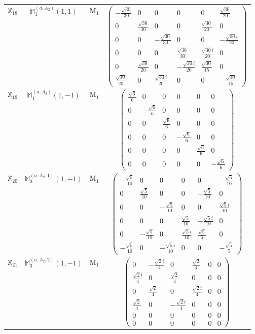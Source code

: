 \documentclass[fleqn,10pt,landscape]{article}
\begin{document}
\begin{itemize}
\begin{center}
\begin{longtable}{c|c|c|c}
$ \mathbb{X}_{18} $ & $\mathbb{M}_{1}^{(a,A_{2})}(1,1)$ & M$_{1}$ & $\begin{pmatrix} - \frac{\sqrt{30}}{30} & 0 & 0 & 0 & 0 & \frac{\sqrt{30}}{20} \\ 0 & \frac{\sqrt{30}}{30} & 0 & 0 & \frac{\sqrt{30}}{20} & 0 \\ 0 & 0 & - \frac{\sqrt{30}}{30} & 0 & 0 & - \frac{\sqrt{30} i}{20} \\ 0 & 0 & 0 & \frac{\sqrt{30}}{30} & \frac{\sqrt{30} i}{20} & 0 \\ 0 & \frac{\sqrt{30}}{20} & 0 & - \frac{\sqrt{30} i}{20} & \frac{\sqrt{30}}{15} & 0 \\ \frac{\sqrt{30}}{20} & 0 & \frac{\sqrt{30} i}{20} & 0 & 0 & - \frac{\sqrt{30}}{15} \end{pmatrix}$ \\
$ \mathbb{X}_{19} $ & $\mathbb{M}_{1}^{(a,A_{2})}(1,-1)$ & M$_{1}$ & $\begin{pmatrix} \frac{\sqrt{6}}{6} & 0 & 0 & 0 & 0 & 0 \\ 0 & - \frac{\sqrt{6}}{6} & 0 & 0 & 0 & 0 \\ 0 & 0 & \frac{\sqrt{6}}{6} & 0 & 0 & 0 \\ 0 & 0 & 0 & - \frac{\sqrt{6}}{6} & 0 & 0 \\ 0 & 0 & 0 & 0 & \frac{\sqrt{6}}{6} & 0 \\ 0 & 0 & 0 & 0 & 0 & - \frac{\sqrt{6}}{6} \end{pmatrix}$ \\
$ \mathbb{X}_{20} $ & $\mathbb{M}_{3}^{(a,A_{2},1)}(1,-1)$ & M$_{1}$ & $\begin{pmatrix} - \frac{\sqrt{5}}{10} & 0 & 0 & 0 & 0 & - \frac{\sqrt{5}}{10} \\ 0 & \frac{\sqrt{5}}{10} & 0 & 0 & - \frac{\sqrt{5}}{10} & 0 \\ 0 & 0 & - \frac{\sqrt{5}}{10} & 0 & 0 & \frac{\sqrt{5} i}{10} \\ 0 & 0 & 0 & \frac{\sqrt{5}}{10} & - \frac{\sqrt{5} i}{10} & 0 \\ 0 & - \frac{\sqrt{5}}{10} & 0 & \frac{\sqrt{5} i}{10} & \frac{\sqrt{5}}{5} & 0 \\ - \frac{\sqrt{5}}{10} & 0 & - \frac{\sqrt{5} i}{10} & 0 & 0 & - \frac{\sqrt{5}}{5} \end{pmatrix}$ \\
$ \mathbb{X}_{21} $ & $\mathbb{M}_{3}^{(a,A_{2},2)}(1,-1)$ & M$_{1}$ & $\begin{pmatrix} 0 & - \frac{\sqrt{2} i}{4} & 0 & \frac{\sqrt{2}}{4} & 0 & 0 \\ \frac{\sqrt{2} i}{4} & 0 & \frac{\sqrt{2}}{4} & 0 & 0 & 0 \\ 0 & \frac{\sqrt{2}}{4} & 0 & \frac{\sqrt{2} i}{4} & 0 & 0 \\ \frac{\sqrt{2}}{4} & 0 & - \frac{\sqrt{2} i}{4} & 0 & 0 & 0 \\ 0 & 0 & 0 & 0 & 0 & 0 \\ 0 & 0 & 0 & 0 & 0 & 0 \end{pmatrix}$ \\

\end{longtable}
\end{center}
\end{itemize}
\end{document}

